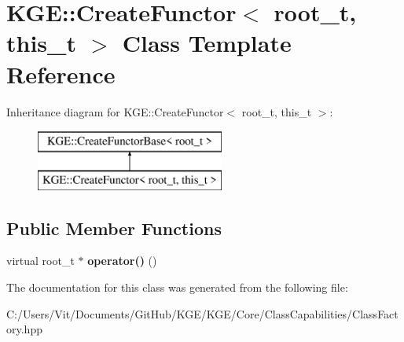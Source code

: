 \hypertarget{class_k_g_e_1_1_create_functor}{\section{K\-G\-E\-:\-:Create\-Functor$<$ root\-\_\-t, this\-\_\-t $>$ Class Template Reference}
\label{class_k_g_e_1_1_create_functor}
}
Inheritance diagram for K\-G\-E\-:\-:Create\-Functor$<$ root\-\_\-t, this\-\_\-t $>$\-:\begin{figure}[H]
\begin{center}
\leavevmode
\includegraphics[height=2.000000cm]{class_k_g_e_1_1_create_functor}
\end{center}
\end{figure}
\subsection*{Public Member Functions}
\begin{DoxyCompactItemize}
\item 
\hypertarget{class_k_g_e_1_1_create_functor_a488fd93790fe3db78de1d435e272024e}{virtual root\-\_\-t $\ast$ {\bfseries operator()} ()}\label{class_k_g_e_1_1_create_functor_a488fd93790fe3db78de1d435e272024e}

\end{DoxyCompactItemize}


The documentation for this class was generated from the following file\-:\begin{DoxyCompactItemize}
\item 
C\-:/\-Users/\-Vit/\-Documents/\-Git\-Hub/\-K\-G\-E/\-K\-G\-E/\-Core/\-Class\-Capabilities/Class\-Factory.\-hpp\end{DoxyCompactItemize}
